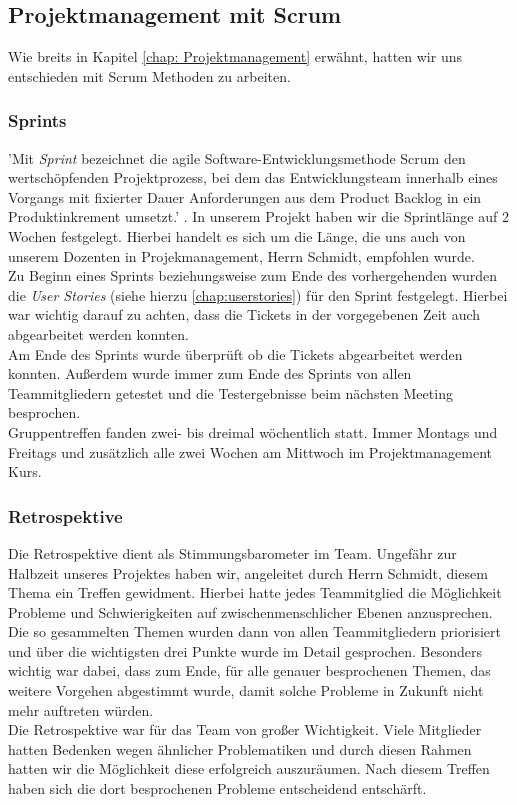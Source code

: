 \documentclass[11pt]{article}
\begin{document}
\subsection{Projektmanagement mit Scrum}
Wie breits in Kapitel \ref{chap: Projektmanagement} erwähnt, hatten wir uns entschieden mit Scrum Methoden zu arbeiten.
\subsubsection{Sprints}
'Mit \textit{Sprint} bezeichnet die agile Software-Entwicklungsmethode Scrum den wertschöpfenden Projektprozess, bei dem das Entwicklungsteam innerhalb eines Vorgangs mit fixierter Dauer Anforderungen aus dem Product Backlog in ein Produktinkrement umsetzt.' \parencite{ProjektMagazin2014}. In unserem Projekt haben wir die Sprintlänge auf 2 Wochen festgelegt. Hierbei handelt es sich um die Länge, die uns auch von unserem Dozenten in Projekmanagement, Herrn Schmidt, empfohlen wurde.\\
Zu Beginn eines Sprints beziehungsweise zum Ende des vorhergehenden wurden die \textit{User Stories} (siehe hierzu \ref{chap:userstories}) für den Sprint festgelegt. Hierbei war wichtig darauf zu achten, dass die Tickets in der vorgegebenen Zeit auch abgearbeitet werden konnten.\\
Am Ende des Sprints wurde überprüft ob die Tickets abgearbeitet werden konnten. Außerdem wurde immer zum Ende des Sprints von allen Teammitgliedern getestet und die Testergebnisse beim nächsten Meeting besprochen.\\
Gruppentreffen fanden zwei- bis dreimal wöchentlich statt. Immer Montags und Freitags und zusätzlich alle zwei Wochen am Mittwoch im Projektmanagement Kurs.
\subsubsection{Retrospektive}
Die Retrospektive dient als Stimmungsbarometer im Team. Ungefähr zur Halbzeit unseres Projektes haben wir, angeleitet durch Herrn Schmidt, diesem Thema ein Treffen gewidment. Hierbei hatte jedes Teammitglied die Möglichkeit Probleme und Schwierigkeiten auf zwischenmenschlicher Ebenen anzusprechen. Die so gesammelten Themen wurden dann von allen Teammitgliedern priorisiert und über die wichtigsten drei Punkte wurde im Detail gesprochen. Besonders wichtig war dabei, dass zum Ende, für alle genauer besprochenen Themen, das weitere Vorgehen abgestimmt wurde, damit solche Probleme in Zukunft nicht mehr auftreten würden.\\
Die Retrospektive war für das Team von großer Wichtigkeit. Viele Mitglieder hatten Bedenken wegen ähnlicher Problematiken und durch diesen Rahmen hatten wir die Möglichkeit diese erfolgreich auszuräumen. Nach diesem Treffen haben sich die dort besprochenen Probleme entscheidend entschärft.
\end{document}
